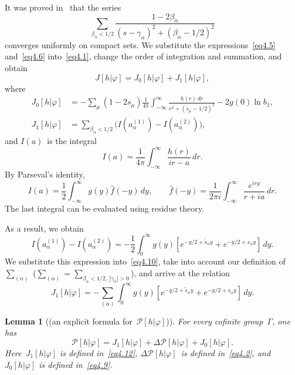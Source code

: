 \documentclass{amsart}
\theoremstyle{plain}
\newtheorem{lemma}{Lemma}
\theoremstyle{definition}
\numberwithin{equation}{section}
\begin{document}
It was proved in~\cite{1,12} that the series
$$
\sum_{\beta_\alpha<1/2}
\frac{1-2\beta_\alpha}{(s-\gamma_\alpha)^2+(\beta_\alpha-1/2)^2}
$$
converges uniformly on compact sets. We substitute the
expressions~\eqref{eq4.5} and~\eqref{eq4.6} into~\eqref{eq4.1},
change the order of integration and summation, and obtain
\begin{equation}
\label{eq4.8}
J[h|\varphi]=J_0[h|\varphi]+J_1[h|\varphi],
\end{equation}
where
\begin{align}
\label{eq4.9}
J_0[h|\varphi]&=-\sum_{\mu}(1-2s_\mu)\frac{1}{4\pi}\int_{-\infty}^\infty
\frac{h(r)\,dr}{r^2+(s_\mu-1/2)^2}-2g(0)\ln b_1,
\\
\label{eq4.10}
J_1[h|\varphi]&=\sum_{\beta_\alpha<1/2}\bigl(I(a_\alpha^{(1)})-
I(a_\alpha^{(2)})\bigr),
\end{align}
and $I(a)$~is the integral
$$
I(a)=\frac{1}{4\pi}\int_{-\infty}^\infty\frac{h(r)}{ir-a}\,dr.
$$
By Parseval's identity,
$$
I(a)=\frac{1}{2}\int_{-\infty}^\infty g(y)\hat{f}(-y)\,dy,\qquad
\hat{f}(-y)=\frac{1}{2\pi i}\int_{-\infty}^\infty\frac{e^{iry}}{r+ia}\,dr.
$$
The last integral can be evaluated using residue theory.

As a result, we obtain
\begin{equation}
\label{eq4.11}
I(a_\alpha^{(1)})-I(a_\alpha^{(2)})=-\frac{1}{2}\int_0^\infty g(y)
[e^{-y/2+\tilde s_\alpha y}+e^{-y/2+s_\alpha y}]\,dy.
\end{equation}
We substitute this expression into~\eqref{eq4.10}, take into
account our definition of~$\sum_{(\alpha)}$
($\sum_{(\alpha)}=\sum_{\beta_\alpha<1/2,\ |\gamma_\alpha|>0}$),
and arrive at the relation
\begin{equation}
\label{eq4.12}
J_1[h|\varphi]=-\sum_{(\alpha)}\int_0^\infty g(y)[e^{-y/2+\tilde s_\alpha y}+
e^{-y/2+s_\alpha y}]\,dy.
\end{equation}

\begin{lemma}[{\rm(an explicit formula for~$\mathscr{P}[h|\varphi]$)}]
 \label{lem3}
For every cofinite group~$\Gamma$, one has
\begin{equation}
\label{eq4.13}
\mathscr{P}[h|\varphi]=J_1[h|\varphi]+\Delta\mathscr{P}[h|\varphi]+
J_0[h|\varphi].
\end{equation}
Here~$J_1[h|\varphi]$ is defined in~\eqref{eq4.12}, $\Delta
\mathscr{P}[h|\varphi]$~is defined in~\eqref{eq4.2},
and~$J_0[h|\varphi]$ is defined in~\eqref{eq4.9}.
\end{lemma}
\end{document}
